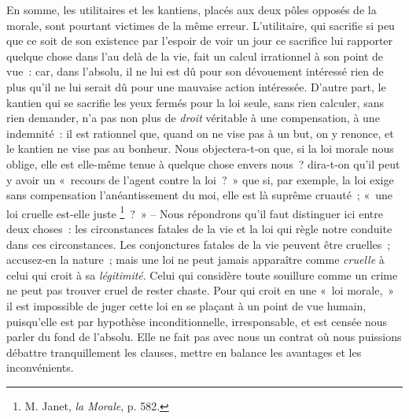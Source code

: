 \documentclass[french,twoside]{book} %
\begin{document}
En somme, les utilitaires et les kantiens, placés aux deux pôles opposés de la morale, sont pourtant victimes de la même erreur. L’utilitaire, qui sacrifie si peu que ce soit de son existence par l’espoir de voir un jour ce sacrifice lui rapporter quelque chose dans l’au delà de la vie, fait un calcul irrationnel à son point de vue : car, dans l’absolu, il ne lui est dû pour son dévouement intéressé rien de plus qu’il ne lui serait dû pour une mauvaise action intéressée. D’autre part, le kantien qui se sacrifie les yeux fermés pour la loi seule, sans rien calculer, sans rien demander, n’a pas non plus de \emph{droit} véritable à une compensation, à une indemnité : il est rationnel que, quand on ne vise pas à un but, on y renonce, et le kantien ne vise pas au bonheur. Nous objectera-t-on que, si la loi morale nous oblige, elle est elle-même tenue à quelque chose envers nous ? dira-t-on qu’il peut y avoir un « recours de l’agent contre la loi ? » que si, par exemple, la loi exige sans compensation l’anéantissement du moi, elle est là suprême cruauté ; « une loi cruelle est-elle juste \footnote{M. Janet, \emph{la Morale}, p. 582.} ? » – Nous répondrons qu’il faut distinguer ici entre deux choses : les circonstances fatales de la vie et la loi qui règle notre conduite dans ces circonstances. Les conjonctures fatales de la vie peuvent être cruelles ; accusez-en la nature ; mais une loi ne peut jamais apparaître comme \emph{cruelle} à celui qui croit à sa \emph{légitimité}. Celui qui considère toute souillure comme un crime ne peut pas trouver cruel de rester chaste. Pour qui croit en une « loi morale, » il est impossible de juger cette loi en se plaçant à un point de vue humain, puisqu’elle est par hypothèse inconditionnelle, irresponsable, et est censée nous parler du fond de l’absolu. Elle ne fait pas avec nous un contrat où nous puissions débattre tranquillement les clauses, mettre en balance les avantages et les inconvénients.\par
\end{document}
